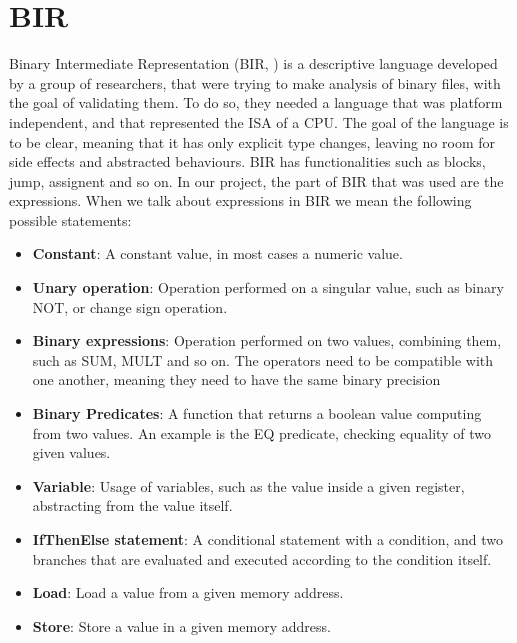 \section{BIR}
\label{cha:BIR} Binary Intermediate Representation (BIR, \cite{bir_pub}) is a
descriptive language developed by a group of researchers, that were trying to make
analysis of binary files, with the goal of validating them. To do so, they
needed a language that was platform independent, and that represented the ISA of
a CPU. The goal of the language is to be clear, meaning that it has only explicit
type changes, leaving no room for side effects and abstracted behaviours. BIR has
functionalities such as blocks, jump, assignent and so on. In our project, the part
of BIR that was used are the expressions. When we talk about expressions in BIR
we mean the following possible statements:
\begin{itemize}
  \item \textbf{Constant}: A constant value, in most cases a numeric value.

  \item \textbf{Unary operation}: Operation performed on a singular value, such
    as binary NOT, or change sign operation.

  \item \textbf{Binary expressions}: Operation performed on two values,
    combining them, such as SUM, MULT and so on. The operators need to be compatible
    with one another, meaning they need to have the same binary precision

  \item \textbf{Binary Predicates}: A function that returns a boolean value computing
    from two values. An example is the EQ predicate, checking equality of two given
    values.

  \item \textbf{Variable}: Usage of variables, such as the value inside a given
    register, abstracting from the value itself.

  \item \textbf{IfThenElse statement}: A conditional statement with a condition,
    and two branches that are evaluated and executed according to the condition
    itself.

  \item \textbf{Load}: Load a value from a given memory address.

  \item \textbf{Store}: Store a value in a given memory address.


\end{itemize}

